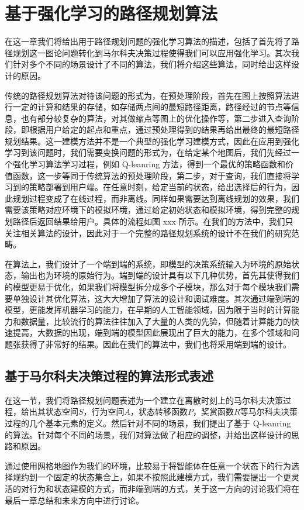 \documentclass{standalone}
\begin{document}
	
\chapter{基于强化学习的路径规划算法}
在这一章我们将给出用于路径规划问题的强化学习算法的描述，包括了首先将了路径规划这一图论问题转化到马尔科夫决策过程使得我们可以应用强化学习。其次我们针对多个不同的场景设计了不同的算法，我们将介绍这些算法，同时给出这样设计的原因。\par
传统的路径规划算法对待该问题的形式为，在预处理阶段，首先在图上按照算法进行一定的计算和结果的存储，如存储两点间的最短路径距离，路径经过的节点等信息，也有部分较复杂的算法，对其做缩点等图上的优化操作等，第二步进入查询阶段，即根据用户给定的起点和重点，通过预处理得到的结果再给出最终的最短路径规划结果。这一建模方法并不是一个典型的强化学习建模方式，因此在应用到强化学习到该问题时，我们需要变换问题的形式为，在给定某个地图后，我们先经过一个强化学习算法学习过程，例如 Q-leanring 方法，得到一个最优的策略函数和价值函数，这一步等同于传统算法的预处理阶段，第二步，对于查询，我们直接将学习到的策略部署到用户端。在任意时刻，给定当前的状态，给出选择后的行为，因此规划过程变成了在线过程，而非离线。同样如果需要达到离线规划的效果，我们需要该策略对应环境下的模拟环境，通过给定初始状态和模拟环境，得到完整的规划路径后返回结果给用户。具体的流程如图 xxx 所示。在我们的方法中，我们只关注相关算法的设计，因此对于一个完整的路径规划系统的设计不在我们的研究范畴。\par
在算法上，我们设计了一个端到端的系统，即模型的决策系统输入为环境的原始状态，输出也为环境的原始行为。端到端的设计具有以下几种优势，首先其使得我们的模型更易于优化，如果我们将模型拆分成多个子模块，那么对于每个模块我们需要单独设计其优化算法，这大大增加了算法的设计和调试难度。其次通过端到端的模型，更能发挥机器学习的能力，在早期的人工智能领域，因为限于当时的计算能力和数据量，比较流行的算法往往加入了大量的人类的先验，但随着计算能力的快速提高，大数据的出现，端到端的模型因此展现出了巨大的能力，在多个领域和问题张获得了非常好的结果。因此在我们的算法中，我们也将采用端到端的设计。\par

\section{基于马尔科夫决策过程的算法形式表述}
在这一节，我们将路径规划问题表述为一个建立在离散时刻上的马尔科夫决策过程，给出其状态空间$S$，行为空间$A$，状态转移函数$P$，奖赏函数$R$等马尔科夫决策过程的几个基本元素的定义。然后针对不同的场景，我们提出了基于
Q-leanring 的算法。针对每个不同的场景，我们对算法做了相应的调整，并给出这样设计的思路和原因。\par
通过使用网格地图作为我们的环境，比较易于将智能体在任意一个状态下的行为选择规约到一个固定的状态集合上，如果不按照此建模方式，我们需要提出一个更灵活的对行为和状态建模的方式，而非端到端的方式，关于这一方向的讨论我们将在最后一章总结和未来方向中进行讨论。
\end{document}
